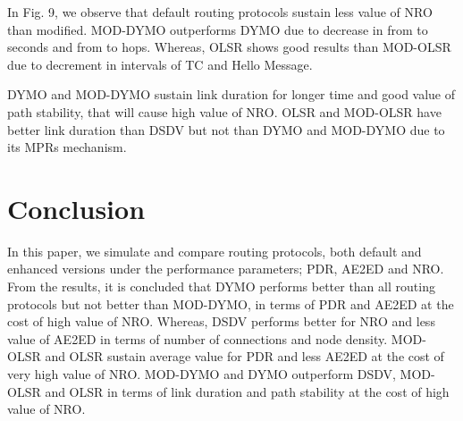 \documentclass[journal]{IEEEtran}
\begin{document}
In Fig. 9, we observe that default routing protocols sustain less value of NRO than modified. MOD-DYMO outperforms DYMO due to decrease in  from  to  seconds and  from  to  hops. Whereas, OLSR shows good results than MOD-OLSR due to decrement in intervals of TC and Hello Message.

DYMO and MOD-DYMO sustain link duration for longer time and good value of path stability, that will cause high value of NRO. OLSR and MOD-OLSR have better link duration than DSDV but not than DYMO and MOD-DYMO due to its MPRs mechanism.

\section{Conclusion}
In this paper, we simulate and compare routing protocols, both default and enhanced versions under the performance parameters; PDR, AE2ED and NRO. From the results, it is concluded that DYMO performs better than all routing protocols but not better than MOD-DYMO, in terms of PDR and AE2ED at the cost of high value of NRO. Whereas, DSDV performs better for NRO and less value of AE2ED in terms of number of connections and node density. MOD-OLSR and OLSR sustain average value for PDR and less AE2ED at the cost of very high value of NRO. MOD-DYMO and DYMO outperform DSDV, MOD-OLSR and OLSR in terms of link duration and path stability at the cost of high value of NRO.
\end{document}
